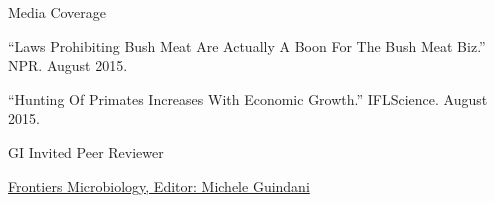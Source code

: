 \begin{cventries}
\vspace{.5cm}
\cventry
    {}
    {Media Coverage}
    {}
    {}
    {
     \begin{cvitems} %
        \item{``Laws Prohibiting Bush Meat Are Actually A Boon For The Bush Meat Biz.'' NPR. August 2015.}
        \item{``Hunting Of Primates Increases With Economic Growth.'' IFLScience. August 2015.}
      \end{cvitems}
    }
    
\vspace{.5cm}
\cventry
    {} GI 
    {Invited Peer Reviewer}
    {}
    {}
    {
     \begin{cvitems} %
        \item{\href{https://doi.org/10.3389/fmicb.2018.00297}{Frontiers Microbiology, Editor: Michele Guindani}}
      \end{cvitems}
    }
\end{cventries}


